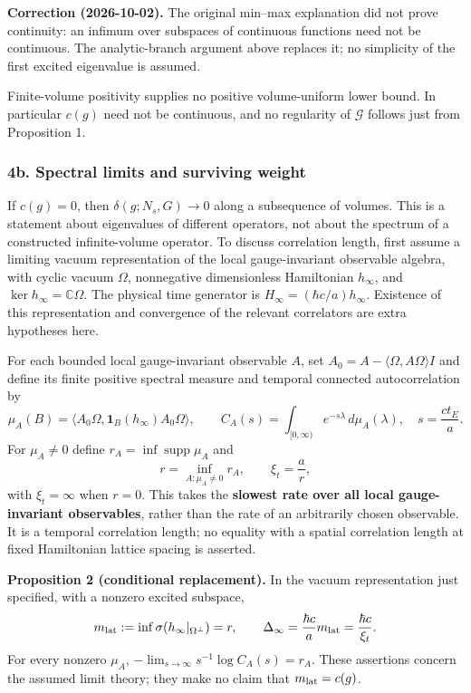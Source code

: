 \documentclass[11pt,a4paper]{article}
\begin{document}
\textbf{Correction (2026-10-02).} The original min--max explanation did
not prove continuity: an infimum over subspaces of continuous functions
need not be continuous. The analytic-branch argument above replaces it;
no simplicity of the first excited eigenvalue is assumed.

Finite-volume positivity supplies no positive volume-uniform lower
bound. In particular \(c(g)\) need not be continuous, and no regularity
of \(\mathcal G\) follows just from Proposition 1.

\subsubsection{4b. Spectral limits and surviving
weight}\label{b.-spectral-limits-and-surviving-weight}

If \(c(g)=0\), then \(\delta(g;N_s,G)\to0\) along a subsequence of
volumes. This is a statement about eigenvalues of different operators,
not about the spectrum of a constructed infinite-volume operator. To
discuss correlation length, first assume a limiting vacuum
representation of the local gauge-invariant observable algebra, with
cyclic vacuum \(\Omega\), nonnegative dimensionless Hamiltonian
\(h_\infty\), and \(\ker h_\infty=\mathbb C\Omega\). The physical time
generator is \(H_\infty=(\hbar c/a)h_\infty\). Existence of this
representation and convergence of the relevant correlators are extra
hypotheses here.

For each bounded local gauge-invariant observable \(A\), set
\(A_0=A-\langle\Omega,A\Omega\rangle I\) and define its finite positive
spectral measure and temporal connected autocorrelation by
\[\mu_A(B)=\langle A_0\Omega,\mathbf1_B(h_\infty)A_0\Omega\rangle,
\qquad C_A(s)=\int_{[0,\infty)}e^{-s\lambda}\,d\mu_A(\lambda),
\quad s=\frac{ct_E}{a}.\] For \(\mu_A\ne0\) define
\(r_A=\inf\operatorname{supp}\mu_A\) and
\[r=\inf_{A:\mu_A\ne0}r_A,\qquad \xi_t=\frac{a}{r},\] with
\(\xi_t=\infty\) when \(r=0\). This takes the \textbf{slowest rate over
all local gauge-invariant observables}, rather than the rate of an
arbitrarily chosen observable. It is a temporal correlation length; no
equality with a spatial correlation length at fixed Hamiltonian lattice
spacing is asserted.

\textbf{Proposition 2 (conditional replacement).} In the vacuum
representation just specified, with a nonzero excited subspace,
\[m_{\rm lat}:=\inf\sigma(h_\infty|_{\Omega^\perp})=r,
\qquad \Delta_\infty=\frac{\hbar c}{a}m_{\rm lat}
=\frac{\hbar c}{\xi_t}.\] For every nonzero \(\mu_A\),
\(-\lim_{s\to\infty}s^{-1}\log C_A(s)=r_A\). These assertions concern
the assumed limit theory; they make no claim that \(m_{\rm lat}=c(g)\).
\end{document}
